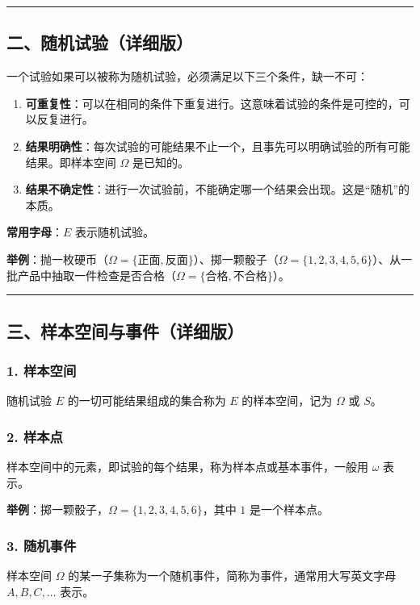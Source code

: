 \documentclass[12pt,a4paper]{ctexart}
\begin{document}
\vspace{1em}\hrule\vspace{1em}

\subsection{二、随机试验（详细版）}

一个试验如果可以被称为随机试验，必须满足以下三个条件，缺一不可：

\begin{enumerate}[noitemsep]
    \item \textbf{可重复性}：可以在相同的条件下重复进行。这意味着试验的条件是可控的，可以反复进行。
    \item \textbf{结果明确性}：每次试验的可能结果不止一个，且事先可以明确试验的所有可能结果。即样本空间 $\Omega$ 是已知的。
    \item \textbf{结果不确定性}：进行一次试验前，不能确定哪一个结果会出现。这是“随机”的本质。
\end{enumerate}

\textbf{常用字母}：$E$ 表示随机试验。

\textbf{举例}：抛一枚硬币（$\Omega = \{\text{正面}, \text{反面}\}$）、掷一颗骰子（$\Omega = \{1,2,3,4,5,6\}$）、从一批产品中抽取一件检查是否合格（$\Omega = \{\text{合格}, \text{不合格}\}$）。

\vspace{1em}\hrule\vspace{1em}

\subsection{三、样本空间与事件（详细版）}

\subsubsection{1. 样本空间}
随机试验 $E$ 的一切可能结果组成的集合称为 $E$ 的样本空间，记为 $\Omega$ 或 $S$。

\subsubsection{2. 样本点}
样本空间中的元素，即试验的每个结果，称为样本点或基本事件，一般用 $\omega$ 表示。

\textbf{举例}：掷一颗骰子，$\Omega = \{1,2,3,4,5,6\}$，其中 $1$ 是一个样本点。

\subsubsection{3. 随机事件}
样本空间 $\Omega$ 的某一子集称为一个随机事件，简称为事件，通常用大写英文字母 $A, B, C, \dots$ 表示。
\end{document}
